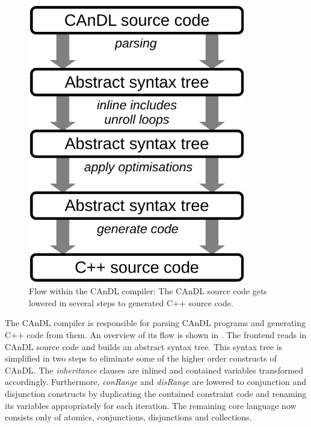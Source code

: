 \begin{figure}[t]
\centering
\begin{minipage}{0.7\textwidth}
\centering
\includegraphics[width=0.85\textwidth]{figures/candlstages.pdf}
\caption{Flow within the CAnDL compiler:
         The CAnDL source code gets lowered in several steps to generated C++
         source code.}
\label{fig:compilerflow}
\end{minipage}
\end{figure}

    The CAnDL compiler is responsible for parsing CAnDL programs and
    generating C++ code from them.
    An overview of its  flow is shown in .
    The frontend reads in  CAnDL source code and builds an abstract syntax tree.
    This syntax tree is simplified in two steps to eliminate some of the higher
    order constructs of CAnDL.
    The {\it inheritance} clauses are inlined and contained variables
    transformed accordingly.
    Furthermore, {\it conRange} and {\it disRange} are lowered to
    conjunction and disjunction constructs by duplicating the contained
    constraint code and renaming its variables appropriately for each iteration.
    The remaining core language now consists only of atomics, conjunctions,
    disjunctions and collections.


